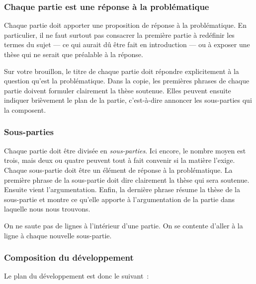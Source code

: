 \documentclass[a4paper]{article}
\begin{document}
\subsubsection{Chaque partie est une réponse à la problématique}
\label{sec-3-1-2}


Chaque partie doit apporter une proposition de réponse à la
problématique. En particulier, il ne faut surtout pas consacrer la
première partie à redéfinir les termes du sujet --- ce qui aurait dû
être fait en introduction --- ou à exposer une thèse qui ne serait que
préalable à la réponse.

Sur votre brouillon, le titre de chaque partie doit répondre
explicitement à la question qu'est la problématique. Dans la copie, les
premières phrases de chaque partie doivent formuler clairement la thèse
soutenue. Elles peuvent ensuite indiquer brièvement le plan de la
partie, c'est-à-dire annoncer les sous-parties qui la composent.
\subsubsection{Sous-parties}
\label{sec-3-1-3}


Chaque partie doit être divisée en \emph{sous-parties}. Ici encore, le nombre
moyen est trois, mais deux ou quatre peuvent tout à fait convenir si la
matière l'exige. Chaque sous-partie doit être un élément de réponse à la
problématique. La première phrase de la sous-partie doit dire clairement
la thèse qui sera soutenue. Ensuite vient l'argumentation. Enfin, la
dernière phrase résume la thèse de la sous-partie et montre ce qu'elle
apporte à l'argumentation de la partie dans laquelle nous nous trouvons.

On ne saute pas de lignes à l'intérieur d'une partie. On se contente
d'aller à la ligne à chaque nouvelle sous-partie.
\subsubsection{Composition du développement}
\label{sec-3-1-4}


Le plan du développement est donc le suivant :
\end{document}
